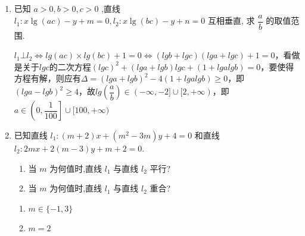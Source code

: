 \begin{enumerate}
    \item 已知 $a > 0,b > 0,c > 0$ ,直线 ${l}_{1} : x\lg \left( {ac}\right)  - y + m = 0,{l}_{2} : x\lg \left( {bc}\right)  - y + n = 0$ 互相垂直, 求 $\dfrac{a}{b}$ 的取值范围.
    \begin{jieda}
        $l_1 \bot l_2 \Longleftrightarrow lg(ac) \times lg(bc) + 1 = 0  \Longleftrightarrow (lgb + lgc) (lga + lgc) + 1 = 0$，看做是关于$lgc$的二次方程$(lgc)^2 + (lga + lgb) lgc + (1+lgalgb) = 0$，要使得方程有解，则应有$\Delta = (lga + lgb)^2 - 4(1+lgalgb) \geq 0$，即$(lga - lgb)^2 \geq 4$，故$lg\left(\dfrac{a}{b}\right) \in (-\infty, -2] \cup [2, +\infty)$，即$a \in \left(0, \dfrac{1}{100}\right] \cup [100, +\infty)$
    \end{jieda}
    
    \item 已知直线 ${l}_{1} : \left( {m + 2}\right) x + \left( {{m}^{2} - {3m}}\right) y + 4 = 0$ 和直线${l}_{2} : {2mx} + 2\left( {m - 3}\right) y + m + 2 = 0$.
    \begin{enumerate}
        \item 当 $m$ 为何值时,直线 ${l}_{1}$ 与直线 ${l}_{2}$ 平行?
        \item 当 $m$ 为何值时,直线 ${l}_{1}$ 与直线 ${l}_{2}$ 重合?
    \end{enumerate}
    \begin{jieda}
        \begin{enumerate}
            \item $m \in \{-1, 3\}$
            \item $m = 2$
        \end{enumerate}
    \end{jieda}
    

\end{enumerate}
